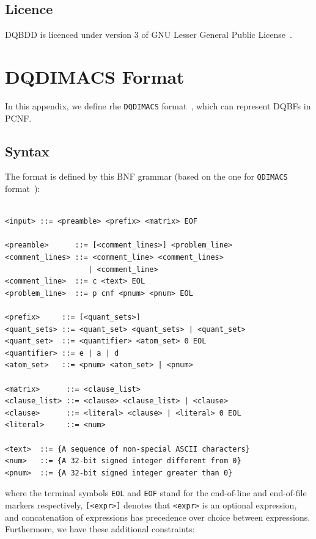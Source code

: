 \documentclass[
  digital, %
  color,
  twoside, %
  table,   %
  nolof,     %
  nolot,     %
]{fithesis3}
\theoremstyle{definition}
\theoremstyle{remark}
\newcommand{\DQDIMACS}[0]{\texttt{DQDIMACS}}
\begin{document}
\section{Licence}
DQBDD is licenced under version 3 of GNU Lesser General Public License~\cite{lgplv3}.

\chapter{DQDIMACS Format}
\label{appendix:DQDIMACS}
In this appendix, we define rhe \DQDIMACS{} format~\cite{iDQandDQDIMACS}, which can represent DQBFs in PCNF. 

\section{Syntax}
The format is defined by this BNF grammar (based on the one for \texttt{QDIMACS} format~\cite{QDIMACS}):
\begin{verbatim}

<input> ::= <preamble> <prefix> <matrix> EOF

<preamble>      ::= [<comment_lines>] <problem_line>
<comment_lines> ::= <comment_line> <comment_lines> 
                   | <comment_line> 
<comment_line>  ::= c <text> EOL
<problem_line>  ::= p cnf <pnum> <pnum> EOL

<prefix>     ::= [<quant_sets>]
<quant_sets> ::= <quant_set> <quant_sets> | <quant_set>
<quant_set>  ::= <quantifier> <atom_set> 0 EOL
<quantifier> ::= e | a | d
<atom_set>   ::= <pnum> <atom_set> | <pnum>

<matrix>      ::= <clause_list>
<clause_list> ::= <clause> <clause_list> | <clause> 
<clause>      ::= <literal> <clause> | <literal> 0 EOL
<literal>     ::= <num>

<text>  ::= {A sequence of non-special ASCII characters}
<num>   ::= {A 32-bit signed integer different from 0}
<pnum>  ::= {A 32-bit signed integer greater than 0}

\end{verbatim}
where the terminal symbols \verb|EOL| and \verb|EOF| stand for the end-of-line and end-of-file markers respectively, \verb|[<expr>]| denotes that \verb|<expr>| is an optional expression, and concatenation of expressions has precedence over choice between expressions. Furthermore, we have these additional constraints:
\end{document}
